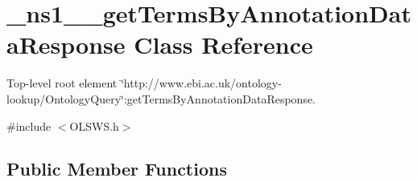 \hypertarget{class__ns1____getTermsByAnnotationDataResponse}{
\section{\_\-ns1\_\-\_\-getTermsByAnnotationDataResponse Class Reference}
\label{class__ns1____getTermsByAnnotationDataResponse}
}


Top-\/level root element \char`\"{}http://www.ebi.ac.uk/ontology-\/lookup/OntologyQuery\char`\"{}:getTermsByAnnotationDataResponse.  




{\ttfamily \#include $<$OLSWS.h$>$}

\subsection*{Public Member Functions}
